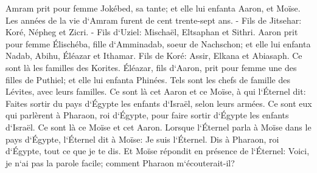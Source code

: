 \verse Amram prit pour femme Jokébed, sa tante; et elle lui enfanta Aaron, et Moïse. Les années de la vie d`Amram furent de cent trente-sept ans. - 
\verse Fils de Jitsehar: Koré, Népheg et Zicri. - 
\verse Fils d`Uziel: Mischaël, Eltsaphan et Sithri. 
\verse Aaron prit pour femme Élischéba, fille d`Amminadab, soeur de Nachschon; et elle lui enfanta Nadab, Abihu, Éléazar et Ithamar. 
\verse Fils de Koré: Assir, Elkana et Abiasaph. Ce sont là les familles des Korites. 
\verse Éléazar, fils d`Aaron, prit pour femme une des filles de Puthiel; et elle lui enfanta Phinées. Tels sont les chefs de famille des Lévites, avec leurs familles. 
\verse Ce sont là cet Aaron et ce Moïse, à qui l`Éternel dit: Faites sortir du pays d`Égypte les enfants d`Israël, selon leurs armées. 
\verse Ce sont eux qui parlèrent à Pharaon, roi d`Égypte, pour faire sortir d`Égypte les enfants d`Israël. Ce sont là ce Moïse et cet Aaron. 
\verse Lorsque l`Éternel parla à Moïse dans le pays d`Égypte, 
\verse l`Éternel dit à Moïse: Je suis l`Éternel. Dis à Pharaon, roi d`Égypte, tout ce que je te dis. 
\verse Et Moïse répondit en présence de l`Éternel: Voici, je n`ai pas la parole facile; comment Pharaon m`écouterait-il? 

\chapter{}

